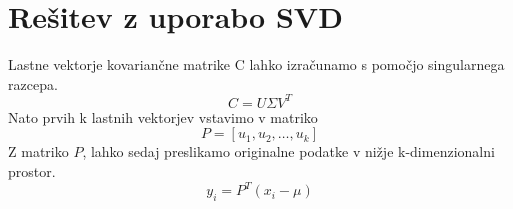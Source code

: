 \section{Rešitev z uporabo SVD}
Lastne vektorje kovariančne matrike C lahko izračunamo s pomočjo singularnega razcepa.~\cite{zupan2024uozp}
\begin{equation}
  C = U \Sigma V^T
\end{equation}
Nato prvih k lastnih vektorjev vstavimo v matriko
\begin{equation}
  P = [u_1, u_2, \dots, u_k]
\end{equation}
Z matriko $P$, lahko sedaj preslikamo originalne podatke v nižje k-dimenzionalni prostor.
\begin{equation}
  y_i = P^T (x_i - \mu)
\end{equation}